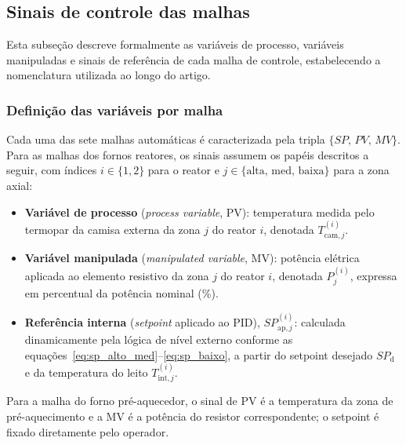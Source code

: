 \subsection{Sinais de controle das malhas}
\label{sec:sinais_controle}

Esta subseção descreve formalmente as variáveis de processo, variáveis
manipuladas e sinais de referência de cada malha de controle, estabelecendo
a nomenclatura utilizada ao longo do artigo.

\subsubsection{Definição das variáveis por malha}

Cada uma das sete malhas automáticas é caracterizada pela tripla
\(\{SP,\,PV,\,MV\}\). Para as malhas dos fornos reatores, os sinais assumem
os papéis descritos a seguir, com índices $i \in \{1,2\}$ para o reator e
$j \in \{\text{alta, med, baixa}\}$ para a zona axial:

\begin{itemize}
  \item \textbf{Variável de processo} (\textit{process variable}, PV):
    temperatura medida pelo termopar da camisa externa da zona $j$ do
    reator $i$, denotada $T^{(i)}_{\text{cam},j}$.
  \item \textbf{Variável manipulada} (\textit{manipulated variable}, MV):
    potência elétrica aplicada ao elemento resistivo da zona $j$ do reator $i$,
    denotada $P^{(i)}_j$, expressa em percentual da potência nominal (\%).
  \item \textbf{Referência interna} (\textit{setpoint} aplicado ao PID),
    $SP^{(i)}_{\mathrm{ap},j}$: calculada dinamicamente pela lógica de nível
    externo conforme as equações~\eqref{eq:sp_alto_med}--\eqref{eq:sp_baixo},
    a partir do setpoint desejado $SP_{\mathrm{d}}$ e da temperatura do leito
    $T^{(i)}_{\mathrm{int},j}$.
\end{itemize}

Para a malha do forno pré-aquecedor, o sinal de PV é a temperatura da zona
de pré-aquecimento e a MV é a potência do resistor correspondente; o setpoint
é fixado diretamente pelo operador.


